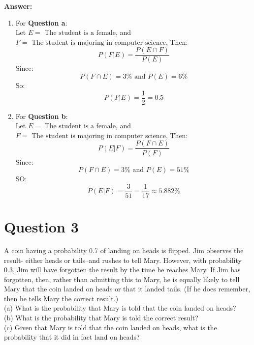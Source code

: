 \documentclass[hidelinks]{article}
\begin{document}
\textbf{ \large Answer:}
\begin{enumerate}
    \item For \textbf{Question a}:\\
    Let $ E = \text{ The student is a female}$, and $ F = \text{ The student is majoring in computer science}$, Then:
    $$ P(F|E) = \frac{P(E \cap F)}{P(E)}$$
    Since:
    $$ P(F \cap E) = 3\% \text{ and } P(E) = 6\% $$ 
    So:
    $$ P(F|E) = \frac{1}{2} = 0.5$$
    \item For \textbf{Question b}:\\
    Let $ E = \text{ The student is a female}$, and $ F = \text{ The student is majoring in computer science}$, Then:
    $$ P(E|F) = \frac{P(F \cap E)}{P(F)}$$
    Since:
    $$ P(F \cap E) = 3\% \text{ and } P(E) = 51\% $$ 
    SO:
    $$ P(E|F) = \frac{3}{51} = \frac{1}{17} \approx 5.882\%$$
\end{enumerate}
\section{Question 3}
A coin having a probability 0.7 of landing on heads is flipped. Jim observes the result- either heads or tails–and rushes to tell Mary. However, with probability 0.3, Jim will have forgotten the result by the time he reaches Mary. If Jim has forgotten, then, rather than admitting this to Mary, he is equally likely to tell Mary that the coin landed on heads or that it landed tails. (If he does remember, then he tells Mary the correct result.)\\
(a) What is the probability that Mary is told that the coin landed on heads?\\
(b) What is the probability that Mary is told the correct result?\\
(c) Given that Mary is told that the coin landed on heads, what is the probability that it did in fact land on heads?
\end{document}
